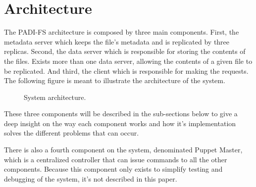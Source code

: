 \section{Architecture}

The PADI-FS architecture is composed by three main components. First, the
metadata server which keeps the file's metadata and is replicated by three
replicas. Second, the data server which is responsible for storing the contents
of the files. Exists more than one data server, allowing the contents of
a given file to be replicated. And third, the client which is responsible for
making the requests.\\

The following figure is meant to illustrate the architecture of the system.\\

\begin{figure}[H]
  	\caption{System architecture.}
\end{figure}

These three components will be described in the sub-sections below to give
a deep insight on the way each component works and how it's implementation
solves the different problems that can occur.

There is also a fourth component on the system, denominated Puppet Master,
which is a centralized controller that can issue commands to all the other
components. Because this component only exists to simplify testing and
debugging of the system, it's not described in this paper.





